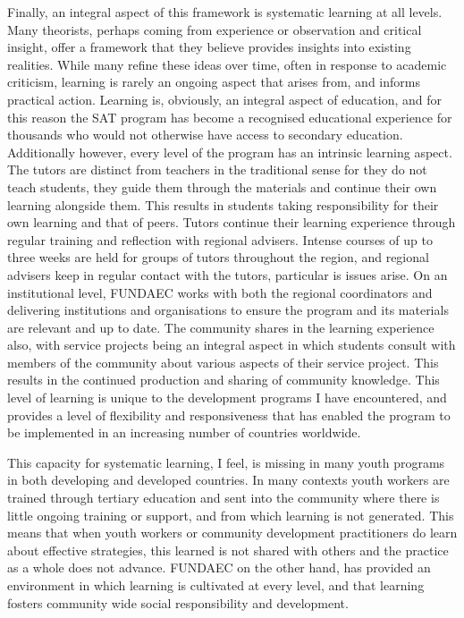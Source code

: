 Finally, an integral aspect of this framework is systematic learning at all levels. Many theorists, perhaps coming from experience or observation and critical insight, offer a framework that they believe provides insights into existing realities. While many refine these ideas over time, often in response to academic criticism, learning is rarely an ongoing aspect that arises from, and informs practical action. Learning is, obviously, an integral aspect of education, and for this reason the SAT program has become a recognised educational experience for thousands who would not otherwise have access to secondary education. Additionally however, every level of the program has an intrinsic learning aspect. The tutors are distinct from teachers in the traditional sense for they do not teach students, they guide them through the materials and continue their own learning alongside them. This results in students taking responsibility for their own learning and that of peers. Tutors continue their learning experience through regular training and reflection with regional advisers. Intense courses of up to three weeks are held for groups of tutors throughout the region, and regional advisers keep in regular contact with the tutors, particular is issues arise. On an institutional level, FUNDAEC works with both the regional coordinators and delivering institutions and organisations to ensure the program and its materials are relevant and up to date. The community shares in the learning experience also, with service projects being an integral aspect in which students consult with members of the community about various aspects of their service project. This results in the continued production and sharing of community knowledge. This level of learning is unique to the development programs I have encountered, and provides a level of flexibility and responsiveness that has enabled the program to be implemented in an increasing number of countries worldwide. 

This capacity for systematic learning, I feel, is missing in many youth programs in both developing and developed countries. In many contexts youth workers are trained through tertiary education and sent into the community where there is little ongoing training or support, and from which learning is not generated. This means that when youth workers or community development practitioners do learn about effective strategies, this learned is not shared with others and the practice as a whole does not advance. FUNDAEC on the other hand, has provided an environment in which learning is cultivated at every level, and that learning fosters community wide social responsibility and development.




